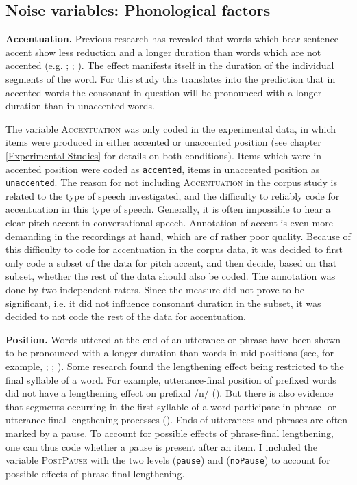 \subsection{Noise variables: Phonological factors}

\textbf{Accentuation.} Previous research has revealed that words which bear sentence accent show less reduction and a longer duration than words which are not accented (e.g. \citealt{Sluijter.1996}; \citealt{Sugahara.2009}; \citealt{Bergmann.}). The  effect manifests itself in the duration of the individual segments of the word. For this study this translates into the prediction that in accented words the consonant in question will be pronounced with a longer duration than in unaccented words. 

The variable \textsc{Accentuation} was only coded in the experimental data, in which items were produced in either accented or unaccented position (see chapter \ref{Experimental Studies} for details on both conditions). Items which were in accented position were coded as \texttt{accented}, items in unaccented position as \texttt{unaccented}. 
The reason for not including \textsc{Accentuation} in the corpus study is related to the type of speech investigated, and the difficulty to reliably code for accentuation in this type of speech. Generally, it is often impossible to hear a clear pitch accent in conversational speech. 
Annotation of accent is even more demanding in the recordings at hand, which are of rather poor quality. Because of this difficulty to code for accentuation in the corpus data, it was decided to first only code a subset of the data for pitch accent, and then decide, based on that subset, whether the rest of the data should also be coded. The annotation was done by two independent raters. Since the measure did not prove to be significant, i.e. it did not influence consonant duration in the subset, it was decided to not code the rest of the data for accentuation.\\  
\vspace*{-0.3cm}

\textbf{Position.} Words uttered at the end of an utterance or phrase have been shown to be pronounced with a longer duration than words in mid-positions (see, for example,  \citealt{Berkovits.1993}; \citealt{Hay.2007}; \citealt{Oller.1973}). Some research found the lengthening effect being restricted to the final syllable of a word. For example, utterance-final position of prefixed words did not have a lengthening effect on prefixal /n/ (\citealt{Hay.2007}). But there is also evidence that segments occurring in the first syllable of a word participate in phrase- or utterance-final lengthening processes (\citealt{Oller.1973}). Ends of utterances and phrases are often marked by a pause. To account for possible effects of phrase-final lengthening, one can thus code whether a pause is present after an item. I included the variable \textsc{PostPause} with the two levels (\texttt{pause}) and (\texttt{noPause}) to account for possible effects of phrase-final lengthening. 

